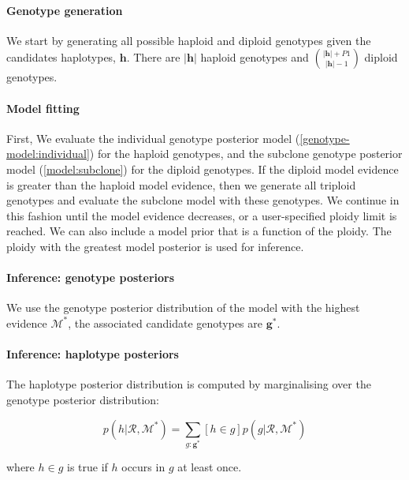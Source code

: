 \documentclass{article}
\begin{document}
\paragraph{Genotype generation}

We start by generating all possible haploid and diploid genotypes given the candidates haplotypes, $\boldsymbol{h}$. There are $|\boldsymbol{h}|$ haploid genotypes and $\binom{|\boldsymbol{h}| + P1}{|\boldsymbol{h}| - 1}$ diploid genotypes.

\paragraph{Model fitting}

First, We evaluate the individual genotype posterior model (\ref{genotype-model:individual}) for the haploid genotypes, and the subclone  genotype posterior model (\ref{model:subclone}) for the diploid genotypes. If the diploid model evidence is greater than the haploid model evidence, then we generate all triploid genotypes and evaluate the subclone model with these genotypes. We continue in this fashion until the model evidence decreases, or a user-specified ploidy limit is reached. We can also include a model prior that is a function of the ploidy. The ploidy with the greatest model posterior is used for inference.

\paragraph{Inference: genotype posteriors}

We use the genotype posterior distribution of the model with the highest evidence $\mathcal{M}^*$, the associated candidate genotypes are $\boldsymbol{g}^*$.

\paragraph{Inference: haplotype posteriors}

The haplotype posterior distribution is computed by marginalising over the genotype posterior distribution:

\begin{equation}
p(h | \mathcal{R}, \mathcal{M}^*) = \sum_{g : \boldsymbol{g}^*} [h \in g]p(g | \mathcal{R}, \mathcal{M}^*)
\end{equation}

where $h \in g$ is true if $h$ occurs in $g$ at least once.
\end{document}
